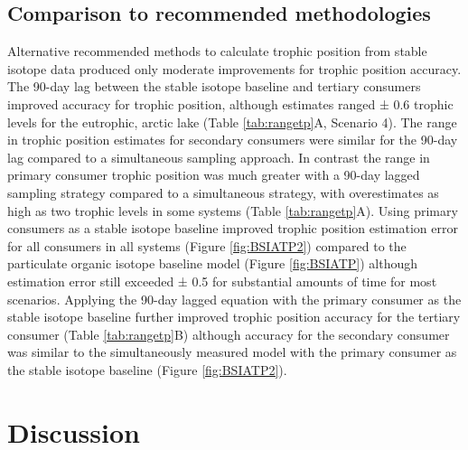 \documentclass [11pt, proquest] {uwthesis}[2015/03/03]
\begin{document}
\subsection{Comparison to recommended
methodologies}\label{comparison-to-recommended-methodologies-1}

Alternative recommended methods to calculate trophic position from
stable isotope data produced only moderate improvements for trophic
position accuracy. The 90-day lag between the stable isotope baseline
and tertiary consumers improved accuracy for trophic position, although
estimates ranged ± 0.6 trophic levels for the eutrophic, arctic lake
(Table \ref{tab:rangetp}A, Scenario 4). The range in trophic position
estimates for secondary consumers were similar for the 90-day lag
compared to a simultaneous sampling approach. In contrast the range in
primary consumer trophic position was much greater with a 90-day lagged
sampling strategy compared to a simultaneous strategy, with
overestimates as high as two trophic levels in some systems (Table
\ref{tab:rangetp}A). Using primary consumers as a stable isotope
baseline improved trophic position estimation error for all consumers in
all systems (Figure \ref{fig:BSIATP2}) compared to the particulate
organic isotope baseline model (Figure \ref{fig:BSIATP}) although
estimation error still exceeded ± 0.5 for substantial amounts of time
for most scenarios. Applying the 90-day lagged equation with the primary
consumer as the stable isotope baseline further improved trophic
position accuracy for the tertiary consumer (Table \ref{tab:rangetp}B)
although accuracy for the secondary consumer was similar to the
simultaneously measured model with the primary consumer as the stable
isotope baseline (Figure \ref{fig:BSIATP2}).

\section{Discussion}\label{discussion-4}
\end{document}
